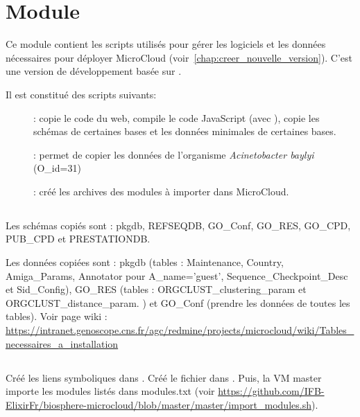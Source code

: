 \chapter{Module \micWEBdeployVer} 


Ce module contient les scripts utilisés pour gérer les logiciels et les données nécessaires pour déployer MicroCloud (voir~\autoref{chap:creer_nouvelle_version}).
C'est une version de développement basée sur .

Il est constitué des scripts suivants:
\begin{description}
	\item[]: copie le code du web, compile le code JavaScript (avec ), copie les schémas de certaines bases et les données minimales de certaines bases.
	\item[]: permet de copier les données de l'organisme \textit{Acinetobacter baylyi} (O\_id=31)
	\item[]: créé les archives des modules à importer dans MicroCloud.
\end{description}

\section{}

Les schémas copiés sont : pkgdb, REFSEQDB, GO\_Conf, GO\_RES, GO\_CPD, PUB\_CPD et PRESTATIONDB.
\newline

Les données copiées sont : pkgdb (tables : Maintenance, Country, Amiga\_Params,
Annotator pour A\_name='guest', Sequence\_Checkpoint\_Desc et Sid\_Config), GO\_RES (tables : ORGCLUST\_clustering\_param et ORGCLUST\_distance\_param.
) et GO\_Conf (prendre les données de toutes les tables). Voir page wiki : \url{https://intranet.genoscope.cns.fr/agc/redmine/projects/microcloud/wiki/Tables_necessaires_a_installation}


\section{}

Créé les liens symboliques dans .
Créé le fichier  dans .
\newline
Puis, la VM master importe les modules listés dans modules.txt (voir \url{https://github.com/IFB-ElixirFr/biosphere-microcloud/blob/master/master/import_modules.sh}).

